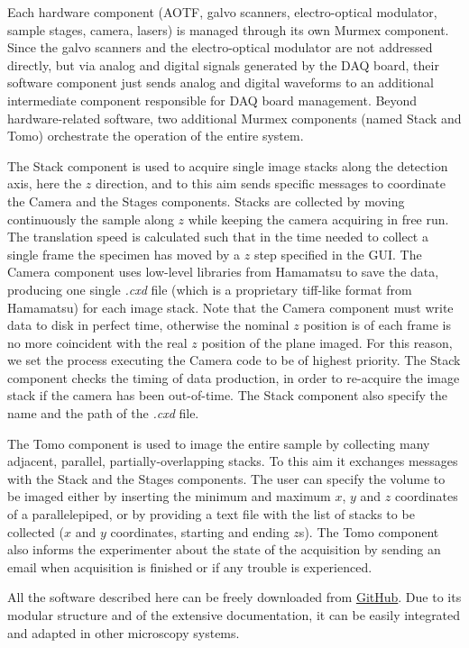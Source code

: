 \documentclass[12pt]{spieman}  %
\begin{document}
Each hardware component (AOTF, galvo scanners, electro-optical modulator, sample stages, camera, lasers) is managed through its own Murmex component. Since the galvo scanners and the electro-optical modulator are not addressed directly, but via analog and digital signals generated by the DAQ board, their software component just sends analog and digital waveforms to an additional intermediate component responsible for DAQ board management. Beyond hardware-related software, two additional Murmex components (named Stack and Tomo) orchestrate the operation of the entire system. 

The Stack component is used to acquire single image stacks along the detection axis, here the $z$ direction, and to this aim sends specific messages to coordinate the Camera and the Stages components. Stacks are collected by moving continuously the sample along $z$ while keeping the camera acquiring in free run. The translation speed is calculated such that in the time needed to collect a single frame the specimen has moved by a $z$ step specified in the GUI. The Camera component uses low-level libraries from Hamamatsu to save the data, producing one single \emph{.cxd} file (which is a proprietary tiff-like format from Hamamatsu) for each image stack. Note that the Camera component must write data to disk in perfect time, otherwise the nominal $z$ position is of each frame is no more coincident with the real $z$ position of the plane imaged. For this reason, we set the process executing the Camera code to be of highest priority. The Stack component checks the timing of data production, in order to re-acquire the image stack if the camera has been out-of-time. The Stack component also specify the name and the path of the \emph{.cxd} file.

The Tomo component is used to image the entire sample by collecting many adjacent, parallel, partially-overlapping stacks. To this aim it exchanges messages with the Stack and the Stages components. The user can specify the volume to be imaged either by inserting the minimum and maximum $x$, $y$ and $z$ coordinates of a parallelepiped, or by providing a text file with the list of stacks to be collected ($x$ and $y$ coordinates, starting and ending $z$s). The Tomo component also informs the experimenter about the state of the acquisition by sending an email when acquisition is finished or if any trouble is experienced.

All the software described here can be freely downloaded from \href{https://github.com/marcelvanthoff/Giorgio}{GitHub}. Due to its modular structure and of the extensive documentation, it can be easily integrated and adapted in other microscopy systems.
\end{document}
